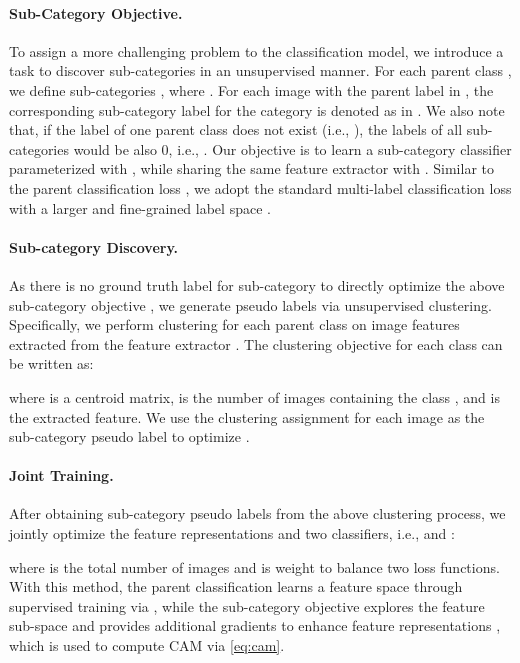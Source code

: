 \documentclass[10pt,twocolumn,letterpaper]{article}
\begin{document}
\paragraph{Sub-Category Objective.}
To assign a more challenging problem to the classification model, we introduce a task to discover sub-categories in an unsupervised manner.
For each parent class , we define  sub-categories , where .
For each image  with the parent label  in , the corresponding sub-category label for the category  is denoted as  in .
We also note that, if the label of one parent class does not exist (i.e., ), the labels of all sub-categories would be also 0, i.e., .
Our objective is to learn a sub-category classifier  parameterized with , while sharing the same feature extractor  with . 
Similar to the parent classification loss , we adopt the standard multi-label classification loss  with a larger and fine-grained label space .







\vspace{-3mm}
\paragraph{Sub-category Discovery.}
As there is no ground truth label for sub-category to directly optimize the above sub-category objective , we generate pseudo labels via unsupervised clustering. 
Specifically, we perform clustering for each parent class on image features extracted from the feature extractor .
The clustering objective for each class  can be written as:

where  is a  centroid matrix,  is the number of images containing the class , and  is the extracted feature.
We use the clustering assignment  for each image as the sub-category pseudo label to optimize .






\vspace{-3mm}
\paragraph{Joint Training.}
After obtaining sub-category pseudo labels  from the above clustering process, we jointly optimize the feature representations  and two classifiers, i.e.,  and :

where  is the total number of images and  is weight to balance two loss functions.
With this method, the parent classification learns a feature space through supervised training via , while the sub-category objective  explores the feature sub-space and provides additional gradients to enhance feature representations , which is used to compute CAM via \eqref{eq:cam}.
\end{document}
